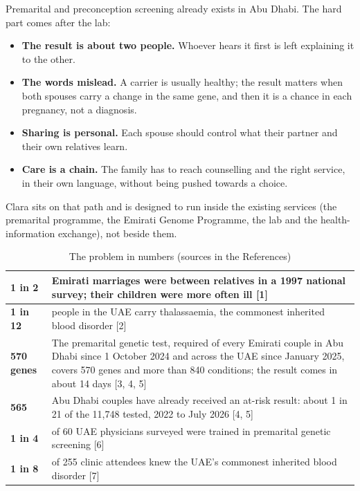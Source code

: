 \documentclass[10.5pt,a4paper]{article}
\newcommand{\toprl}{\arrayrulecolor{ink}\toprule\arrayrulecolor{rule}}
\begin{document}
Premarital and preconception screening already exists in Abu Dhabi. The hard part comes after the lab:

\begin{itemize}
  \item \textbf{The result is about two people.} Whoever hears it first is left explaining it to the other.
  \item \textbf{The words mislead.} A carrier is usually healthy; the result matters when both spouses carry a change in
        the same gene, and then it is a chance in each pregnancy, not a diagnosis.
  \item \textbf{Sharing is personal.} Each spouse should control what their partner and their own relatives learn.
  \item \textbf{Care is a chain.} The family has to reach counselling and the right service, in their own language,
        without being pushed towards a choice.
\end{itemize}

Clara sits on that path and is designed to run inside the existing services (the premarital programme, the Emirati
Genome Programme, the lab and the health-information exchange), not beside them.

{\small
\begin{xltabular}{\textwidth}{@{}P{2.4cm}L@{}}
\caption{The problem in numbers (sources in the References)}\\
\toprl
\textbf{1 in 2} & Emirati marriages were between relatives in a 1997 national survey; their children were more often ill [1]\\
\midrule
\textbf{1 in 12} & people in the UAE carry thalassaemia, the commonest inherited blood disorder [2]\\
\midrule
\textbf{570 genes} & The premarital genetic test, required of every Emirati couple in Abu Dhabi since 1 October 2024 and across the UAE since January 2025, covers 570 genes and more than 840 conditions; the result comes in about 14 days [3, 4, 5]\\
\midrule
\textbf{565} & Abu Dhabi couples have already received an at-risk result: about 1 in 21 of the 11,748 tested, 2022 to July 2026 [4, 5]\\
\midrule
\textbf{1 in 4} & of 60 UAE physicians surveyed were trained in premarital genetic screening [6]\\
\midrule
\textbf{1 in 8} & of 255 clinic attendees knew the UAE's commonest inherited blood disorder [7]\\
\bottomrule
\end{xltabular}}
\end{document}
